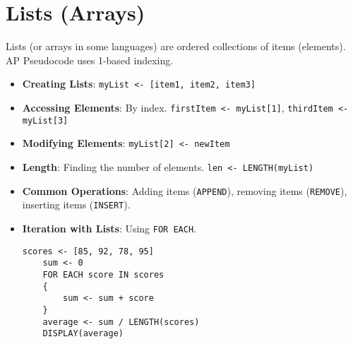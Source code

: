 \documentclass[11pt,oneside]{book}
\begin{document}
\section{Lists (Arrays)}
\label{sec:lists}
Lists (or arrays in some languages) are ordered collections of items (elements). AP Pseudocode uses 1-based indexing.
\begin{itemize}
    \item \textbf{Creating Lists}: \texttt{myList <- [item1, item2, item3]}
    \item \textbf{Accessing Elements}: By index. \texttt{firstItem <- myList[1]}, \texttt{thirdItem <- myList[3]}
    \item \textbf{Modifying Elements}: \texttt{myList[2] <- newItem}
    \item \textbf{Length}: Finding the number of elements. \texttt{len <- LENGTH(myList)}
    \item \textbf{Common Operations}: Adding items (\texttt{APPEND}), removing items (\texttt{REMOVE}), inserting items (\texttt{INSERT}).
    \item \textbf{Iteration with Lists}: Using \texttt{FOR EACH}.
    \begin{lstlisting}[language={}, label={lst:list_iteration}, caption={AP Pseudocode: List Iteration}]
    scores <- [85, 92, 78, 95]
    sum <- 0
    FOR EACH score IN scores
    {
        sum <- sum + score
    }
    average <- sum / LENGTH(scores)
    DISPLAY(average)
    \end{lstlisting}
\end{itemize}
\end{document}
